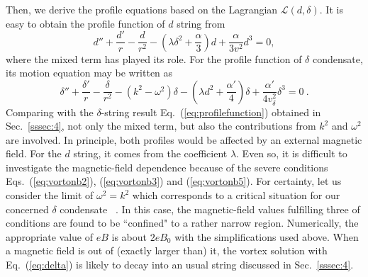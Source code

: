 Then, we derive the profile equations based on the Lagrangian $\mathcal{L}(d,\delta)$.
It is easy to obtain the profile function of $d$ string from
\begin{equation}
  \label{eq:deuler}
  d'' +\frac{d'}{r} - \frac{d}{r^2} - (\lambda \delta^2 + \frac{\alpha}{3})d + \frac{\alpha}{3v^2}d^3 = 0,
\end{equation}
where the mixed term has played its role.
For the profile function of $\delta$ condensate, its motion equation may be written as
\begin{equation}
  \label{eq:beuler}
  \delta'' +\frac{\delta'}{r} - \frac{\delta}{r^2} - (k^2 - \omega^2)\delta - (\lambda d^2 + \frac{\alpha'}{4})\delta + \frac{\alpha'}{4v_\delta^2}\delta^3 = 0 \ .
\end{equation}
Comparing with the $\delta$-string result Eq.~(\ref{eq:profilefunction}) obtained in Sec.~\ref{sssec:4},
not only the mixed term, but also the contributions from $k^2$ and $\omega^2$ are involved.
In principle, both profiles would be affected by an external magnetic field. For the $d$ string, it comes
from the coefficient $\lambda$. Even so, it is difficult to investigate the magnetic-field dependence
because of the severe conditions Eqs.~(\ref{eq:vortonb2}), (\ref{eq:vortonb3}) and (\ref{eq:vortonb5}).
For certainty, let us consider the limit of $\omega^2 = k^2$ which corresponds to a
critical situation for our concerned $\delta$ condensate ~\cite{lemperiere2003behaviour}.
In this case, the magnetic-field values fulfilling three of conditions are found to be ``confined" to a
rather narrow region.
Numerically, the appropriate value of $eB$ is about $2 eB_0$ with the simplifications used above.
When a magnetic field is out of (exactly larger than) it, the vortex solution with Eq.~(\ref{eq:delta})
is likely to decay into an usual string discussed in Sec.~\ref{sssec:4}.

